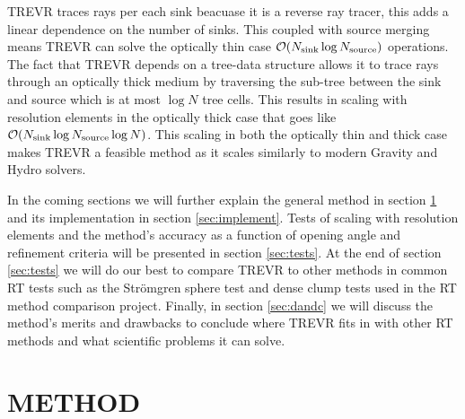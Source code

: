 \documentclass[fleqn,usenatbib]{mnras}
\newcommand{\acro}{TREVR}
\begin{document}
\acro{} traces rays per each sink beacuase it is a reverse ray tracer, this 
adds a linear dependence on the number of sinks. This coupled with source 
merging means \acro{} can solve the optically thin case 
$\mathcal{O}(N_{\rm sink} \log N_{\rm source})$ operations. The fact that
 \acro{} depends on a tree-data structure allows it to trace rays through an 
optically thick medium by traversing the sub-tree between the sink and source 
which is at most $\log N$ tree cells. This results in scaling with resolution
 elements in the optically thick case that goes like 
$\mathcal{O}(N_{\rm sink} \log N_{\rm source} \log N)$. This scaling in both 
the optically thin and thick case makes \acro{} a feasible method as it scales 
similarly to modern Gravity and Hydro solvers.

In the coming sections we will further explain the general method in section 
\ref{sec:method} and its implementation in section \ref{sec:implement}. Tests 
of scaling with resolution elements and the method's accuracy as a function of 
opening angle and refinement criteria will be presented in section 
\ref{sec:tests}. At the end of section \ref{sec:tests} we will do our best to 
compare \acro{} to other methods in common RT tests such as the Str\"{o}mgren
 sphere test and dense clump tests used in the \cite{ilievEt06} RT method 
comparison project. Finally, in section \ref{sec:dandc} we will discuss the 
method's merits and drawbacks to conclude where \acro{} fits in with other RT 
methods and what scientific problems it can solve.



\section{METHOD}\label{sec:method}
\end{document}
